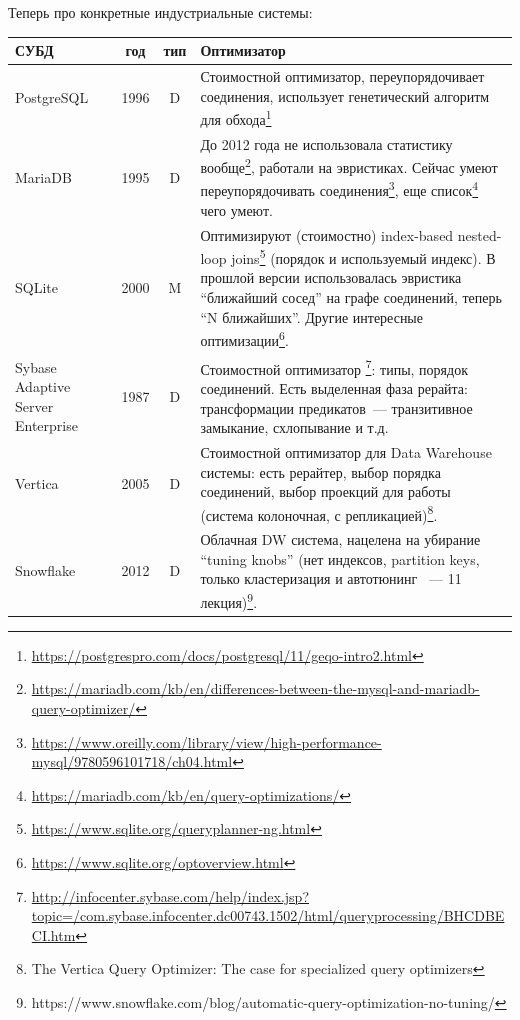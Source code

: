 \documentclass{beamer}
\begin{document}
\begin{frame}[allowframebreaks]
Теперь про конкретные индустриальные системы:

\scriptsize



\begin{table}

\begin{longtable}{|p{2cm}|c|c|p{7.2cm}|}
	\hline
	СУБД & год  & тип  & Оптимизатор \\
	\hline
	
	PostgreSQL & 1996 & D & Стоимостной оптимизатор, переупорядочивает соединения, использует генетический алгоритм для обхода\footnote{\url{https://postgrespro.com/docs/postgresql/11/geqo-intro2.html}}\\
	
	MariaDB & 1995 & D & До 2012 года не использовала статистику вообще\footnote{\url{https://mariadb.com/kb/en/differences-between-the-mysql-and-mariadb-query-optimizer/}}, работали на эвристиках. Сейчас умеют переупорядочивать соединения\footnote{\url{https://www.oreilly.com/library/view/high-performance-mysql/9780596101718/ch04.html}}, еще список\footnote{\url{https://mariadb.com/kb/en/query-optimizations/}} чего умеют.\\
	
	SQLite & 2000 & M & Оптимизируют (стоимостно) index-based nested-loop joins\footnote{\url{https://www.sqlite.org/queryplanner-ng.html}} (порядок и используемый индекс). В прошлой версии использовалась эвристика ``ближайший сосед'' на графе соединений, теперь ``N ближайших''. Другие интересные оптимизации\footnote{\url{https://www.sqlite.org/optoverview.html}}.\\
	

	Sybase Adaptive Server Enterprise & 1987 & D & Стоимостной оптимизатор	\footnote{\url{http://infocenter.sybase.com/help/index.jsp?topic=/com.sybase.infocenter.dc00743.1502/html/queryprocessing/BHCDBECI.htm}}: типы, порядок соединений. Есть выделенная фаза рерайта: трансформации предикатов~--- транзитивное замыкание, схлопывание и т.д.\\

	\hline
	\hline
	
	Vertica & 2005 & D & Стоимостной оптимизатор для Data Warehouse системы: есть рерайтер, выбор порядка соединений, выбор проекций для работы (система колоночная, с репликацией)\footnote{ The Vertica Query Optimizer: The case for specialized query optimizers}.\\
	
	
	Snowflake & 2012 & D & Облачная DW система, нацелена на убирание ``tuning knobs'' (нет индексов, partition keys, только кластеризация и автотюнинг ~--- 11 лекция)\footnote{https://www.snowflake.com/blog/automatic-query-optimization-no-tuning/}.\\
	

\end{longtable}
\end{table}
\end{frame}
\end{document}
